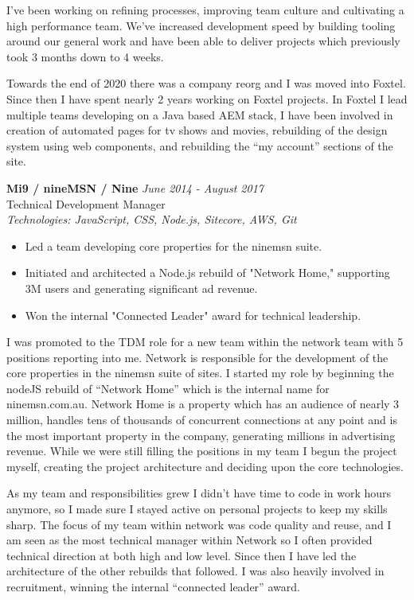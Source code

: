 \documentclass[a4paper,10pt]{article}
\begin{document}
I’ve been working on refining processes, improving team culture and cultivating a high performance team. We’ve 
increased development speed by building tooling around our general work and have been able to deliver projects 
which previously took 3 months down to 4 weeks.

Towards the end of 2020 there was a company reorg and I was moved into Foxtel. Since then I have spent nearly 2 
years working on Foxtel projects. In Foxtel I lead multiple teams developing on a Java based AEM stack, I have been 
involved in creation of automated pages for tv shows and movies, rebuilding of the design system using web 
components, and rebuilding the “my account” sections of the site.

\vspace{1em}

\textbf{Mi9 / nineMSN / Nine} \hfill \textit{June 2014 - August 2017} \\
Technical Development Manager \\
\textit{Technologies: JavaScript, CSS, Node.js, Sitecore, AWS, Git}
\begin{itemize}
    \item Led a team developing core properties for the ninemsn suite.
    \item Initiated and architected a Node.js rebuild of "Network Home," supporting 3M users and generating significant ad revenue.
    \item Won the internal "Connected Leader" award for technical leadership.
\end{itemize}

I was promoted to the TDM role for a new team within the network team with 5 positions reporting into me. Network 
is responsible for the development of the core properties in the ninemsn suite of sites. I started my role by beginning 
the nodeJS rebuild of “Network Home” which is the internal name for ninemsn.com.au. Network Home is a property 
which has an audience of nearly 3 million, handles tens of thousands of concurrent connections at any point and is the 
most important property in the company, generating millions in advertising revenue. While we were still filling the 
positions in my team I begun the project myself, creating the project architecture and deciding upon the core 
technologies.

As my team and responsibilities grew I didn't have time to code in work hours anymore, so I made sure I stayed active 
on personal projects to keep my skills sharp. The focus of my team within network was code quality and reuse, and I 
am seen as the most technical manager within Network so I often provided technical direction at both high and low 
level. Since then I have led the architecture of the other rebuilds that followed. I was also heavily involved in 
recruitment, winning the internal “connected leader” award.
\end{document}
